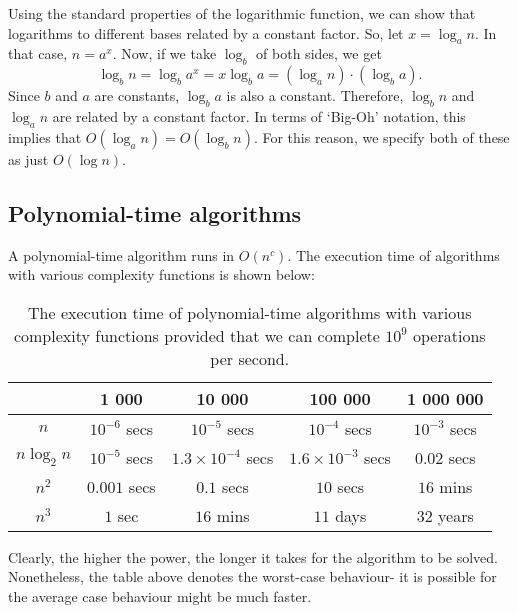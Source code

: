 \documentclass[a4paper, openany]{memoir}
\begin{document}
Using the standard properties of the logarithmic function, we can show that logarithms to different bases related by a constant factor. So, let $x = \log_a n$. In that case, $n = a^x$. Now, if we take $\log_b$ of both sides, we get
\[\log_b n = \log_b a^x = x \log_b a = (\log_a n) \cdot (\log_b a).\]
Since $b$ and $a$ are constants, $\log_b a$ is also a constant. Therefore, $\log_b n$ and $\log_a n$ are related by a constant factor. In terms of `Big-Oh' notation, this implies that $O(\log_a n) = O(\log_b n)$. For this reason, we specify both of these as just $O(\log n)$.

\subsection{Polynomial-time algorithms}
A polynomial-time algorithm runs in $O(n^c)$. The execution time of algorithms with various complexity functions is shown below:
\begin{table}[H]
    \centering
    \begin{tabular}{|c|c|c|c|c|}
        \hline
         & 1 000 & 10 000 & 100 000 & 1 000 000 \\
        \hline
        $n$ & $10^{-6}$ secs & $10^{-5}$ secs & $10^{-4}$ secs & $10^{-3}$ secs \\
        \hline
        $n \log_2 n$ & $10^{-5}$ secs & $1.3 \times 10^{-4}$ secs & $1.6 \times 10^{-3}$ secs & $0.02$ secs \\
        \hline
        $n^2$ & $0.001$ secs & $0.1$ secs & $10$ secs & $16$ mins \\
        \hline
        $n^3$ & $1$ sec & $16$ mins & $11$ days & $32$ years \\
        \hline
    \end{tabular}
    \caption{The execution time of polynomial-time algorithms with various complexity functions provided that we can complete $10^9$ operations per second.}
\end{table}
Clearly, the higher the power, the longer it takes for the algorithm to be solved. Nonetheless, the table above denotes the worst-case behaviour- it is possible for the average case behaviour might be much faster.
\end{document}

